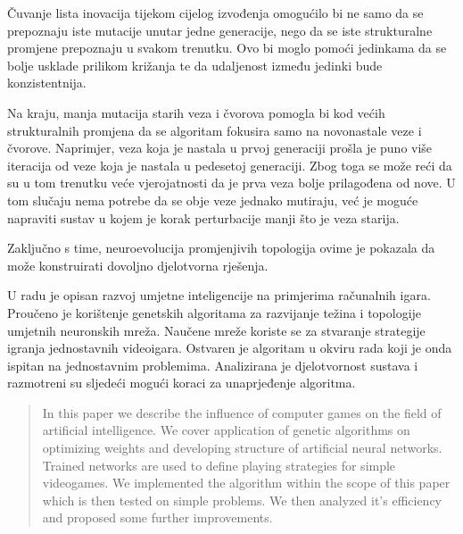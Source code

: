 \documentclass[times, utf8, diplomski, numeric]{fer}
\begin{document}
Čuvanje lista inovacija tijekom cijelog izvođenja omogućilo bi ne samo da se prepoznaju iste mutacije unutar jedne generacije, nego da se iste strukturalne promjene prepoznaju u svakom trenutku. Ovo bi moglo pomoći jedinkama da se bolje usklade prilikom križanja te da udaljenost između jedinki bude konzistentnija.

Na kraju, manja mutacija starih veza i čvorova pomogla bi kod većih strukturalnih promjena da se algoritam fokusira samo na novonastale veze i čvorove. Naprimjer, veza koja je nastala u prvoj generaciji prošla je puno više iteracija od veze koja je nastala u pedesetoj generaciji. Zbog toga se može reći da su u tom trenutku veće vjerojatnosti da je prva veza bolje prilagođena od nove. U tom slučaju nema potrebe da se obje veze jednako mutiraju, već je moguće napraviti sustav u kojem je korak perturbacije manji što je veza starija.

Zaključno s time, neuroevolucija promjenjivih topologija ovime je pokazala da može konstruirati dovoljno djelotvorna rješenja.




\begin{sazetak}
U radu je opisan razvoj umjetne inteligencije na primjerima računalnih igara. Proučeno je korištenje genetskih algoritama za razvijanje težina i topologije umjetnih neuronskih mreža. Naučene mreže koriste se za stvaranje strategije igranja jednostavnih videoigara. Ostvaren je algoritam u okviru rada koji je onda ispitan na jednostavnim problemima. Analizirana je djelotvornost sustava i razmotreni su sljedeći mogući koraci za unaprjeđenje algoritma.

\end{sazetak}

\begin{abstract}
In this paper we describe the influence of computer games on the field of artificial intelligence. We cover application of genetic algorithms on optimizing weights and developing structure of artificial neural networks. Trained networks are used to define playing strategies for simple videogames. We implemented the algorithm within the scope of this paper which is then tested on simple problems. We then analyzed it's efficiency and proposed some further improvements.

\end{abstract}
\end{document}
